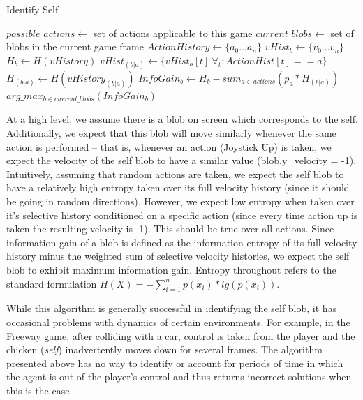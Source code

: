 \documentclass{acm_proc_article-sp}
\begin{document}
\begin{algorithm}
\caption{Identify Self}
\label{alg:idself}
\begin{algorithmic}[1]
  \STATE $possible\_actions \leftarrow $ set of actions applicable to this game
  \STATE $current\_blobs \leftarrow $ set of blobs in the current game frame
  \STATE $ActionHistory \leftarrow \{a_0...a_n\}$ %
  \STATE $vHist_b \leftarrow \{v_0...v_n\}$ %
  \STATE $H_b \leftarrow H(vHistory)$ 
  \STATE $vHist_{(b|a)} \leftarrow \{vHist_b[t] ~\forall_t: ActionHist[t] == a\}$ 
  \STATE $H_{(b|a)} \leftarrow H(vHistory_{(b|a)})$ %
  \ENDFOR
  \STATE $InfoGain_b \leftarrow H_b - sum_{a \in actions}(p_a * H_{(b|a)})$ %
  \ENDFOR
  \RETURN $arg\_max_{b \in current\_blobs}(InfoGain_b)$ %
\end{algorithmic}
\end{algorithm}

At a high level, we assume there is a blob on screen which corresponds to the self. Additionally, we expect that this blob will move similarly whenever the same action is performed -- that is, whenever an action (Joystick Up) is taken, we expect the velocity of the self blob to have a similar value (blob.y\_velocity = -1). Intuitively, assuming that random actions are taken, we expect the self blob to have a relatively high entropy taken over its full velocity history (since it should be going in random directions). However, we expect low entropy when taken over it's selective history conditioned on a specific action (since every time action up is taken the resulting velocity is -1). This should be true over all actions. Since information gain of a blob is defined as the information entropy of its full velocity history minus the weighted sum of selective velocity histories, we expect the self blob to exhibit maximum information gain. Entropy throughout refers to the standard formulation $H(X) = -\sum_{i=1}^n{p(x_i)*lg(p(x_i))}$.

While this algorithm is generally successful in identifying the self blob, it has occasional problems with dynamics of certain environments. For example, in the Freeway game, after colliding with a car, control is taken from the player and the chicken (\textit{self}) inadvertently moves down for several frames. The algorithm presented above has no way to identify or account for periods of time in which the agent is out of the player's control and thus returns incorrect solutions when this is the case. 
\end{document}
